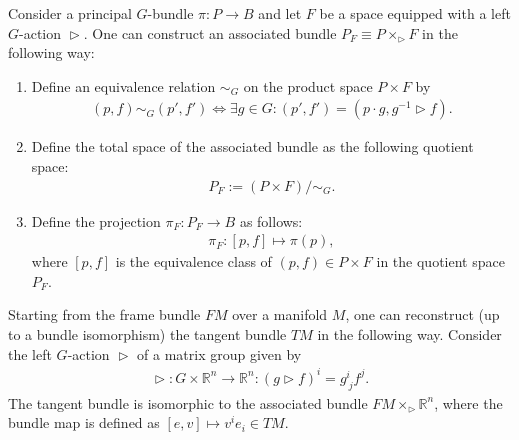    \begin{construct}\label{bundle:associated_bundle}
        Consider a principal $G$-bundle $\pi:P\rightarrow B$ and let $F$ be a space equipped with a left $G$-action $\vartriangleright$. One can construct an associated bundle $P_F\equiv P \times_\vartriangleright F$ in the following way:
        \begin{enumerate}
            \item Define an equivalence relation $\sim_G$ on the product space $P\times F$ by
                \begin{gather}
                    \label{bundle:associated_bundle_equivalence}
                    (p,f)\sim_G(p',f')\iff\exists g\in G:(p',f') = (p\cdot g,g^{-1}\vartriangleright f).
                \end{gather}
            \item Define the total space of the associated bundle as the following quotient space:
                \begin{gather}
                    P_F := (P\times F)/\sim_G.
                \end{gather}
            \item Define the projection $\pi_F:P_F\rightarrow B$ as follows:
                \begin{gather}
                    \pi_F:[p,f]\mapsto\pi(p),
                \end{gather}
            where $[p,f]$ is the equivalence class of $(p,f)\in P\times F$ in the quotient space $P_F$.
        \end{enumerate}
    \end{construct}
    \begin{example}
        Starting from the frame bundle $FM$ over a manifold $M$, one can reconstruct (up to a bundle isomorphism) the tangent bundle $TM$ in the following way. Consider the left $G$-action $\vartriangleright$ of a matrix group given by
        \begin{gather}
            \vartriangleright:G\times\mathbb{R}^n\rightarrow\mathbb{R}^n:(g\vartriangleright f)^i = g^i_{\ j}f^j.
        \end{gather}
        The tangent bundle is isomorphic to the associated bundle $FM\times_\vartriangleright\mathbb{R}^n$, where the bundle map is defined as $[e,v]\mapsto v^ie_i\in TM$.
    \end{example}

